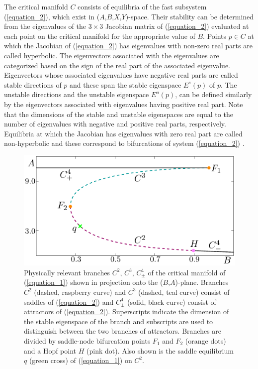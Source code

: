 \documentclass{ws-ijbc}
\begin{document}
The critical manifold $C$ consists of equilibria of the fast subsystem (\ref{equation_2}), which exist in ($A$,$B$,$X$,$Y$)-space.  Their stability can be determined from the eigenvalues of the $3\times3$ Jacobian matrix of (\ref{equation_2}) evaluated at each point on the critical manifold for the appropriate value of $B$.  Points $p \in C$ at which the Jacobian of (\ref{equation_2}) has eigenvalues with non-zero real parts are called hyperbolic.  The eigenvectors associated with the eigenvalues are categorized based on the sign of the real part of the associated eigenvalue.  Eigenvectors whose associated eigenvalues have negative real parts are called stable directions of $p$ and these span the stable eigenspace $E^{s}(p)$ of $p$.  The unstable directions and the unstable eigenspace $E^{u}(p)$, can be defined similarly by the eigenvectors associated with eigenvalues having positive real part.  Note that the dimensions of the stable and unstable eigenspaces are equal to the number of eigenvalues with negative and positive real parts, respectively.  Equilibria at which the Jacobian has eigenvalues with zero real part are called non-hyperbolic and these correspond to bifurcations of system (\ref{equation_2}) \cite{The_Kuz} .

\begin{figure}[!t]
\centering
\includegraphics[]{./figures/MKMO_1.pdf}
\caption{Physically relevant branches $C^2$, $C^3$, $C^4_\pm$ of the critical manifold of (\ref{equation_1}) shown in projection onto the ($B$,$A$)-plane.  Branches $C^2$ (dashed, raspberry curve) and $C^3$ (dashed, teal curve) consist of saddles of (\ref{equation_2}) and $C^4_\pm$ (solid, black curve) consist of attractors of (\ref{equation_2}).  Superscripts indicate the dimension of the stable eigenspace of the branch and subscripts are used to distinguish between the two branches of attractors.  Branches are divided by saddle-node bifurcation points $F_1$ and $F_2$ (orange dots) and a Hopf point $H$ (pink dot).  Also shown is the saddle equilibrium $q$ (green cross) of (\ref{equation_1}) on $C^2$.}
\label{figure_1}
\end{figure}
\end{document}
